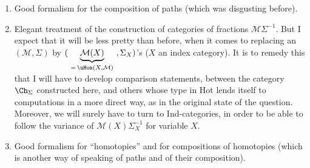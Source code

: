\begin{enumerate}
\item[a)] Good formalism for the composition of paths (which was disgusting before).

\item[b)] Elegant treatment of the construction of categories of fractions $\mathcal{M}\Sigma^{-1}$. But I expect that it will be less pretty than before, when it comes to replacing an $(\mathcal{M},\Sigma)$ by $(\ \underbrace{\mathcal{M}(X)}_{=\,\uHom(X,\mathcal{M})}\ ,\Sigma_X)$'s ($X$ an index category). It is to remedy this that I will have to develop comparison statements, between the category $\Ch_{\Sigma}$ constructed here, and others whose type in Hot lends itself to computations in a more direct way, as in the original state of the question. Moreover, we will surely have to turn to Ind-categories, in order to be able to follow the variance of $\mathcal{M}(X)\Sigma_X^{-1}$ for variable $X$.

\item[c)] Good formalism for ``homotopies'' and for compositions of homotopies (which is another way of speaking of paths and of their composition).
\end{enumerate}
